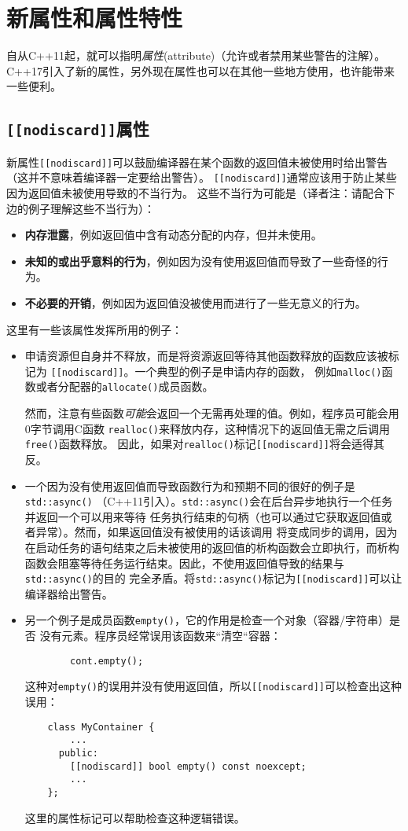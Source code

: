 \section{新属性和属性特性}\label{ch7}
自从C++11起，就可以指明\emph{属性}(attribute)（允许或者禁用某些警告的注解）。
C++17引入了新的属性，另外现在属性也可以在其他一些地方使用，也许能带来一些便利。

\subsection{\texttt{[[nodiscard]]}属性}
新属性\texttt{[[nodiscard]]}可以鼓励编译器在某个函数的返回值未被使用时给出警告
（这并不意味着编译器一定要给出警告）。
\texttt{[[nodiscard]]}通常应该用于防止某些因为返回值未被使用导致的不当行为。
这些不当行为可能是（译者注：请配合下边的例子理解这些不当行为）：
\begin{itemize}[leftmargin=*]
    \item \textbf{内存泄露}，例如返回值中含有动态分配的内存，但并未使用。
    \item \textbf{未知的或出乎意料的行为}，例如因为没有使用返回值而导致了一些奇怪的行为。
    \item \textbf{不必要的开销}，例如因为返回值没被使用而进行了一些无意义的行为。
\end{itemize}
这里有一些该属性发挥所用的例子：
\begin{itemize}[leftmargin=*]
    \item 申请资源但自身并不释放，而是将资源返回等待其他函数释放的函数应该被标记为
    \texttt{[[nodiscard]]}。一个典型的例子是申请内存的函数，
    例如\texttt{malloc()}函数或者分配器的\texttt{allocate()}成员函数。

    然而，注意有些函数\emph{可能}会返回一个无需再处理的值。例如，程序员可能会用0字节调用C函数
    \texttt{realloc()}来释放内存，这种情况下的返回值无需之后调用\texttt{free()}函数释放。
    因此，如果对\texttt{realloc()}标记\texttt{[[nodiscard]]}将会适得其反。
    \item 一个因为没有使用返回值而导致函数行为和预期不同的很好的例子是\texttt{std::async()}
    （C++11引入）。\texttt{std::async()}会在后台异步地执行一个任务并返回一个可以用来等待
    任务执行结束的句柄（也可以通过它获取返回值或者异常）。然而，如果返回值没有被使用的话该调用
    将变成同步的调用，因为在启动任务的语句结束之后未被使用的返回值的析构函数会立即执行，而析构
    函数会阻塞等待任务运行结束。因此，不使用返回值导致的结果与\texttt{std::async()}的目的
    完全矛盾。将\texttt{std::async()}标记为\texttt{[[nodiscard]]}可以让编译器给出警告。
    \item 另一个例子是成员函数\texttt{empty()}，它的作用是检查一个对象（容器/字符串）是否
    没有元素。程序员经常误用该函数来“清空“容器：
    \begin{lstlisting}
        cont.empty();
    \end{lstlisting}
    这种对\texttt{empty()}的误用并没有使用返回值，所以\texttt{[[nodiscard]]}可以检查出这种误用：
    \begin{lstlisting}
    class MyContainer {
        ...
      public:
        [[nodiscard]] bool empty() const noexcept;
        ...
    };
    \end{lstlisting}
    这里的属性标记可以帮助检查这种逻辑错误。
\end{itemize}
